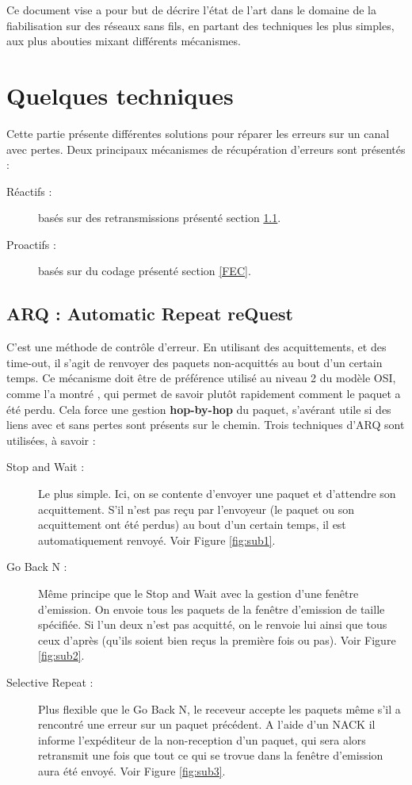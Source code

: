 \documentclass[frenchb]{article}
\begin{document}
Ce document vise a pour but de décrire l'état de l'art dans le domaine de la fiabilisation sur des réseaux sans fils, en partant des techniques les plus simples, aux plus abouties mixant différents mécanismes.


\clearpage

\section{Quelques techniques}
Cette partie présente différentes solutions pour réparer les erreurs sur un canal avec pertes. Deux principaux mécanismes de récupération d'erreurs sont présentés : 
\begin{description}
\item [Réactifs :]  basés sur des retransmissions présenté section \ref{ARQ}.
\item [Proactifs :] basés sur du codage présenté section \ref{FEC}.
\end{description}
\subsection{ARQ : Automatic Repeat reQuest}
\label{ARQ}
C'est une méthode de contrôle d'erreur. En utilisant des acquittements, et des time-out, il s'agit de renvoyer des paquets non-acquittés au bout d'un certain temps.
Ce mécanisme doit être de préférence utilisé au niveau 2 du modèle OSI, comme l'a montré \cite{llfeqarq}, qui permet de savoir plutôt rapidement comment le paquet a été perdu. Cela force une gestion \textbf{hop-by-hop} du paquet, s'avérant utile si des liens avec et sans pertes sont présents sur le chemin.
Trois techniques d'ARQ sont utilisées, à savoir :
\begin{description}
\item[Stop and Wait :] Le plus simple. Ici, on se contente d'envoyer une paquet et d'attendre son acquittement. S'il n'est pas reçu par l'envoyeur (le paquet ou son acquittement ont été perdus) au bout d'un certain temps, il est automatiquement renvoyé. Voir Figure \ref{fig:sub1}.
\item[Go Back N :] Même principe que le Stop and Wait avec la gestion d'une fenêtre d'emission. On envoie tous les paquets de la fenêtre d'emission de taille spécifiée. Si l'un deux n'est pas acquitté, on le renvoie lui ainsi que tous ceux d'après (qu'ils soient bien reçus la première fois ou pas). Voir Figure \ref{fig:sub2}.
\item[Selective Repeat :] Plus flexible que le Go Back N, le receveur accepte les paquets même s'il a rencontré une erreur sur un paquet précédent. A l'aide d'un NACK il informe l'expéditeur de la non-reception d'un paquet, qui sera alors retransmit une fois que tout ce qui se trovue dans la fenêtre d'emission aura été envoyé. Voir Figure \ref{fig:sub3}.
\end{description}
\end{document}
